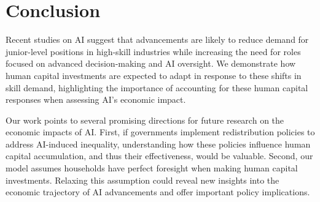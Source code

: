 \documentclass[12pt]{article}
\begin{document}
 












\section{Conclusion}

Recent studies on AI suggest that advancements are likely to reduce demand for junior-level positions in high-skill industries while increasing the need for roles focused on advanced decision-making and AI oversight. We demonstrate how human capital investments are expected to adapt in response to these shifts in skill demand, highlighting the importance of accounting for these human capital responses when assessing AI’s economic impact.

Our work points to several promising directions for future research on the economic impacts of AI. First, if governments implement redistribution policies to address AI-induced inequality, understanding how these policies influence human capital accumulation, and thus their effectiveness, would be valuable. Second, our model assumes households have perfect foresight when making human capital investments. Relaxing this assumption could reveal new insights into the economic trajectory of AI advancements and offer important policy implications.
\end{document}
